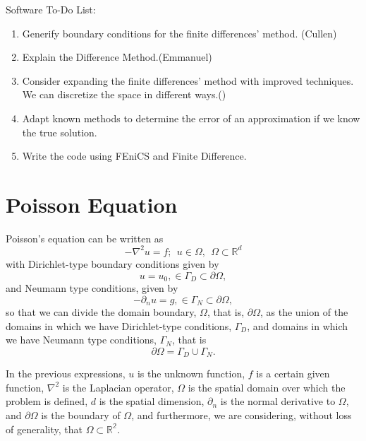 Software To-Do List:
\begin{enumerate}
    \item Generify boundary conditions for the finite differences' method. (Cullen)
    \item Explain the Difference Method.(Emmanuel)
    \item Consider expanding the finite differences' method with improved techniques. We can discretize the space in different ways.() 
    \item Adapt known methods to determine the error of an approximation if we know the true solution.
    \item Write the code using FEniCS and Finite Difference.
\end{enumerate}



\section{Poisson Equation}
Poisson's equation can be written as
\begin{equation}
     -\nabla^2u = f; \ \ u\in \Omega, \ \ \Omega\subset\mathbb{R}^d
\end{equation}
with Dirichlet-type boundary conditions given by
\begin{equation}
     u = u_0, \in \Gamma_D\subset\partial\Omega,
\end{equation}
and Neumann type conditions, given by
\begin{equation}
     -\partial_nu = g, \in \Gamma_N\subset\partial\Omega,
\end{equation}
so that we can divide the domain boundary, $\Omega$, that is, $\partial\Omega$, as the union of the domains in which we have Dirichlet-type conditions, $\Gamma_D$, and domains in which we have Neumann type conditions, $\Gamma_N$, that is
\begin{equation}
     \partial\Omega = \Gamma_D\cup\Gamma_N.
\end{equation}

In the previous expressions, $u$ is the unknown function, $f$ is a certain given function, $\nabla^2$ is the Laplacian operator, $\Omega$ is the spatial domain over which the problem is defined, $d $ is the spatial dimension, $\partial_n$ is the normal derivative to $\Omega$, and $\partial\Omega$ is the boundary of $\Omega$, and furthermore, we are considering, without loss of generality, that $\Omega\subset\mathbb{R^2}$.

